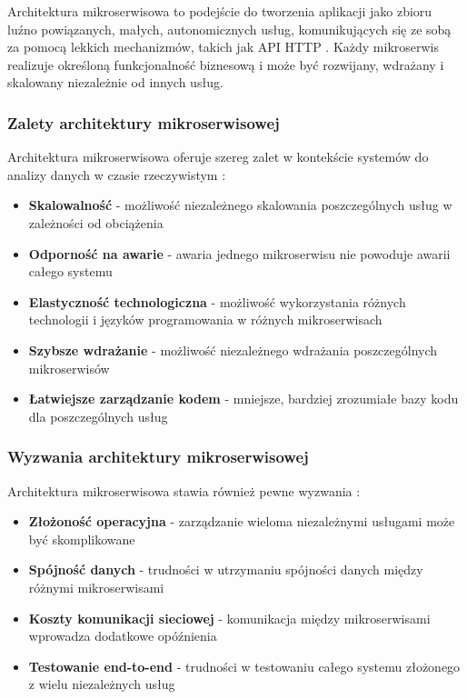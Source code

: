 Architektura mikroserwisowa to podejście do tworzenia aplikacji jako zbioru luźno powiązanych, małych, autonomicznych usług, komunikujących się ze sobą za pomocą lekkich mechanizmów, takich jak API HTTP \citep{microservice_architecture}. Każdy mikroserwis realizuje określoną funkcjonalność biznesową i może być rozwijany, wdrażany i skalowany niezależnie od innych usług.

\subsubsection{Zalety architektury mikroserwisowej}
\label{subsubsec:zalety_mikroserwisow}

Architektura mikroserwisowa oferuje szereg zalet w kontekście systemów do analizy danych w czasie rzeczywistym \citep{microservice_benefits}:

\begin{itemize}
    \item \textbf{Skalowalność} - możliwość niezależnego skalowania poszczególnych usług w zależności od obciążenia
    \item \textbf{Odporność na awarie} - awaria jednego mikroserwisu nie powoduje awarii całego systemu
    \item \textbf{Elastyczność technologiczna} - możliwość wykorzystania różnych technologii i języków programowania w różnych mikroserwisach
    \item \textbf{Szybsze wdrażanie} - możliwość niezależnego wdrażania poszczególnych mikroserwisów
    \item \textbf{Łatwiejsze zarządzanie kodem} - mniejsze, bardziej zrozumiałe bazy kodu dla poszczególnych usług
\end{itemize}

\subsubsection{Wyzwania architektury mikroserwisowej}
\label{subsubsec:wyzwania_mikroserwisow}

Architektura mikroserwisowa stawia również pewne wyzwania \citep{microservice_challenges}:

\begin{itemize}
    \item \textbf{Złożoność operacyjna} - zarządzanie wieloma niezależnymi usługami może być skomplikowane
    \item \textbf{Spójność danych} - trudności w utrzymaniu spójności danych między różnymi mikroserwisami
    \item \textbf{Koszty komunikacji sieciowej} - komunikacja między mikroserwisami wprowadza dodatkowe opóźnienia
    \item \textbf{Testowanie end-to-end} - trudności w testowaniu całego systemu złożonego z wielu niezależnych usług
\end{itemize}

